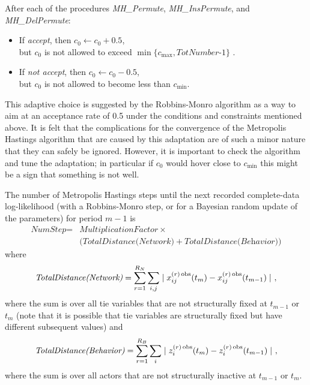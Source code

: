 \documentclass[a4paper,12pt,fleqn]{article}
\newcommand{\ttimes}{\,\times\,}
\begin{document}
\noindent
After each of the procedures
\textit{MH\_Permute}, \textit{MH\_InsPermute}, and \textit{MH\_DelPermute}:
\begin{itemize}
\item[`up'] If \textit{accept}, then $c_0 \leftarrow c_0 + 0.5$,\\
            but $c_0$ is not allowed to exceed $\min \{c_{\text{max}}, \textit{TotNumber-1}\}$ .
\item[`down'] If \textit{not accept}, then $c_0 \leftarrow c_0 - 0.5$,\\
            but $c_0$ is not allowed to become less than $c_\text{min}$.
\end{itemize}

This adaptive choice is suggested by the Robbins-Monro algorithm
as a way to aim at an acceptance rate of 0.5 under the conditions
and constraints mentioned above.
It is felt that the complications for the convergence of
the Metropolis Hastings algorithm that are caused by this adaptation
are of such a minor nature that they can safely be ignored.
However, it is important to check the algorithm and tune the
adaptation; in particular if $c_0$ would hover close to $c_\text{min}$
this might be a sign that something is not well.

The number of Metropolis Hastings steps until the next
recorded complete-data log-likelihood (with a Robbins-Monro step,
or for a Bayesian random update of the parameters)
for period $m-1$ is
\begin{equation}
\begin{split}
  \textit{NumStep} = &
\textit{MultiplicationFactor} \ttimes \\
   & \big(\textit{TotalDistance(Network)} + \textit{TotalDistance(Behavior)} \big)
          \label{NumStep}
\end{split}
\end{equation}
where
      \[
      \textit{TotalDistance(Network)} =
      \sum_{r=1}^{R_N} \sum_{i,j} \mid x^{(r)\,\rm{obs}}_{ij}(t_{m})  - x^{(r)\,\rm{obs}}_{ij}(t_{m-1}) \mid \ ,
      \]
      where the sum is over all tie variables that are not structurally fixed
      at $t_{m-1}$ or $t_m$ (note that
      it is possible that tie variables are structurally fixed but have different subsequent values)
and
      \[
\textit{TotalDistance(Behavior)} =
        \sum_{r=1}^{R_B} \sum_{i} \mid z^{(r)\,\rm{obs}}_{i}(t_{m})  - z^{(r)\,\rm{obs}}_{i}(t_{m-1}) \mid \ ,
      \]
      where the sum is over all actors that are not structurally inactive
      at $t_{m-1}$ or $t_m$.
\end{document}
